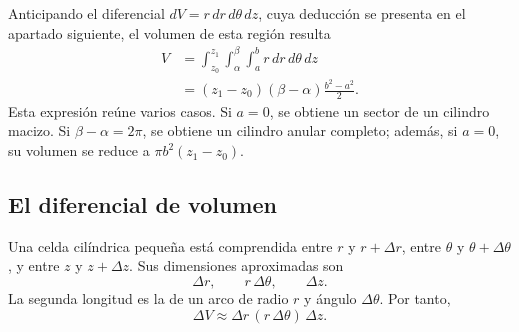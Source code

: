 Anticipando el diferencial $dV=r\,dr\,d\theta\,dz$, cuya deducción se presenta en el apartado siguiente, el volumen de esta región resulta
\begin{align*}
V
&=\int_{z_0}^{z_1}\int_\alpha^\beta\int_a^b
r\,dr\,d\theta\,dz\\
&=(z_1-z_0)(\beta-\alpha)\frac{b^2-a^2}{2}.
\end{align*}
Esta expresión reúne varios casos. Si $a=0$, se obtiene un sector de un cilindro macizo. Si $\beta-\alpha=2\pi$, se obtiene un cilindro anular completo; además, si $a=0$, su volumen se reduce a $\pi b^2(z_1-z_0)$.

\subsection{El diferencial de volumen}

Una celda cilíndrica pequeña está comprendida entre $r$ y $r+\Delta r$, entre $\theta$ y $\theta+\Delta\theta$, y entre $z$ y $z+\Delta z$. Sus dimensiones aproximadas son
\[
\Delta r,\qquad r\,\Delta\theta,\qquad \Delta z.
\]
La segunda longitud es la de un arco de radio $r$ y ángulo $\Delta\theta$. Por tanto,
\[
\Delta V\approx \Delta r\,(r\,\Delta\theta)\,\Delta z.
\]

